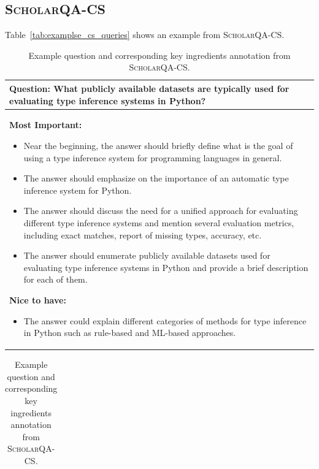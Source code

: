 \subsection{\textsc{ScholarQA}-CS}
\label{app_sec:examples_rubric_qa}

Table~\ref{tab:examplse_cs_queries} shows an example from \textsc{ScholarQA-CS}. 
\begin{table}[t!]
\renewcommand{\arraystretch}{1.2}
\setlength{\tabcolsep}{2pt}
\footnotesize
\begin{subtable}{\textwidth}
    \centering
    \begin{tabular}{p{14cm}}%
\toprule
{\bf Question:} What publicly available datasets are typically used for evaluating type inference systems in Python? \\\midrule
{\bf Most Important:}
\begin{itemize}
   \item Near the beginning, the answer should briefly define what is the goal of using a type inference system for programming languages in general.
   \item The answer should emphasize on the importance of an automatic type inference system for Python.
   \item The answer should discuss the need for a unified approach for evaluating different type inference systems and mention several evaluation metrics, including exact matches, report of missing types, accuracy, etc.
   \item The answer should enumerate publicly available datasets used for evaluating type inference systems in Python and provide a brief description for each of them.
\end{itemize}

{\bf Nice to have:}
   \begin{itemize}
      \item The answer could explain different categories of methods for type inference in Python such as rule-based and ML-based approaches.
   \end{itemize}
\\\bottomrule


 \end{tabular}
    \caption{Example question and corresponding key ingredients annotation from \textsc{ScholarQA-CS}.}
    \end{subtable}

\begin{subtable}{\textwidth}
\centering
\begin{tabular}{p{14cm}}%


\end{tabular}
\end{subtable}
\end{table}
